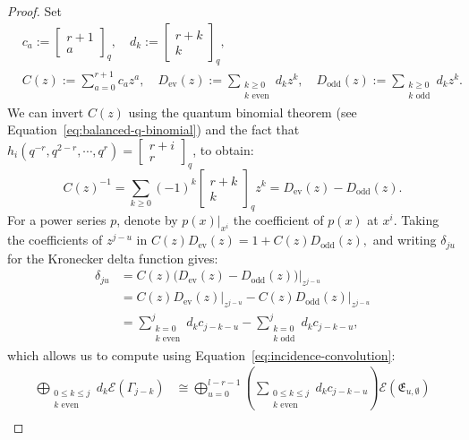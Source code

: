 \documentclass[12pt]{amsart}
\theoremstyle{definition}
\theoremstyle{remark}
\numberwithin{equation}{section}
\numberwithin{figure}{section}
\newcommand{\osum}{\bigoplus}
\begin{document}
\begin{proof}
Set
\begin{align*}
 &c_a:=\begin{bmatrix}r+1\\a\end{bmatrix}_q, \quad
 d_k:=\begin{bmatrix}r+k\\k\end{bmatrix}_q, \\
 &C(z) := \sum_{a=0}^{r+1}c_a z^a, \quad
 D_{\mathrm{ev}}(z) := \sum_{\substack{k\geq0\\k\text{ even}}}d_k z^k, \quad
 D_{\mathrm{odd}}(z) := \sum_{\substack{k\geq0\\k\text{ odd}}} d_k z^k.
\end{align*}
We can invert $C(z)$ using the quantum binomial theorem (see Equation~\eqref{eq:balanced-q-binomial}) and the fact that $h_i(q^{-r},q^{2-r},\cdots,q^r)=\begin{bmatrix}
    r+i\\
    r
  \end{bmatrix}_q$, to obtain:
\begin{equation*}\label{eq:C-inverse}
 C(z)^{-1}=\sum_{k\geq0}(-1)^k \begin{bmatrix}r+k\\k\end{bmatrix}_qz^k = D_{\mathrm{ev}}(z)-D_{\mathrm{odd}}(z).
\end{equation*}
For a power series $p$, denote by $p(x)|_{x^i}$ the coefficient of $p(x)$ at $x^i$. Taking the coefficients of $z^{j-u}$ in $C(z)D_{\mathrm{ev}}(z)=1+C(z)D_{\mathrm{odd}}(z),$ and writing $\delta_{ju}$ for the Kronecker delta function gives:
\begin{align*}
\delta_{ju} &= \left. C(z)\bigl(D_{\mathrm{ev}}(z)- D_{\mathrm{odd}}(z)\bigr) \right|_{z^{j-u}} \\
&= \left.C(z)D_{\mathrm{ev}}(z)\right|_{z^{j-u}} - \left.C(z)D_{\mathrm{odd}}(z)\right|_{z^{j-u}} \\
&= \sum_{\substack{k=0\\k\text{ even}}}^{j} d_kc_{j-k-u} - \sum_{\substack{k=0\\k\text{ odd}}}^{j} d_kc_{j-k-u},
\end{align*}
which allows us to compute using Equation~\eqref{eq:incidence-convolution}:
\begin{align*}
\osum_{\substack{0\leq k\leq j\\k\text{ even}}} d_k\mathcal E(\Gamma_{j-k}) 
 &\cong \osum_{u=0}^{l-r-1} \left( \sum_{\substack{0\leq k\leq j\\k\text{ even}}} d_kc_{j-k-u} \right)\mathcal E(\mathfrak{E}_{u,\emptyset}) \\

\end{align*}
\end{proof}
\end{document}

